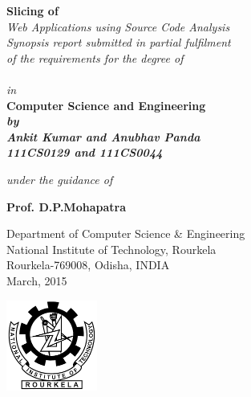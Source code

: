 \documentclass[11pt]{article}   %
\begin{document}
\begin{titlepage}
\thispagestyle{empty}
\vspace*{0.7cm}
{\centering     
\large
{\huge\bf Slicing of \\}\emph{ Web Applications using Source Code Analysis}\\
\vspace{2.5 cm}
\emph{Synopsis report submitted in partial fulfilment\\
of the requirements for the degree of}\\
\vspace{1 cm}{ \bf \large Bachelor of Technology}\\
\emph{in}\\
\bf Computer Science and Engineering\\

\vspace{1cm}
\it
by \\
\vspace{.5cm}
\rm
{\large \bf {Ankit Kumar and Anubhav Panda}}\\
{\large \bf {111CS0129 and 111CS0044}}

\vspace{1cm}

{\it{under the guidance of}} \\
\vspace{.5cm}

\hspace{.05cm} {\large \bf {Prof. D.P.Mohapatra}}\\
\hspace{.05cm} 
\vspace {0.5cm}
\vspace {1 cm}

\begin{figure}[h] 
\centering
\end{figure} 

Department of Computer Science \& Engineering \\ 
National Institute of Technology, Rourkela\\ Rourkela-769008, Odisha, INDIA\\
{\centering
\hspace{6.5cm}March, 2015} 
}
\pagebreak 
\end{titlepage}
\newpage
\begin{minipage}[t]{.2\textwidth}
\vspace{0pt}\includegraphics[width=3cm,height=3cm]{./nit.png}
\end{minipage}%
\end{document}
